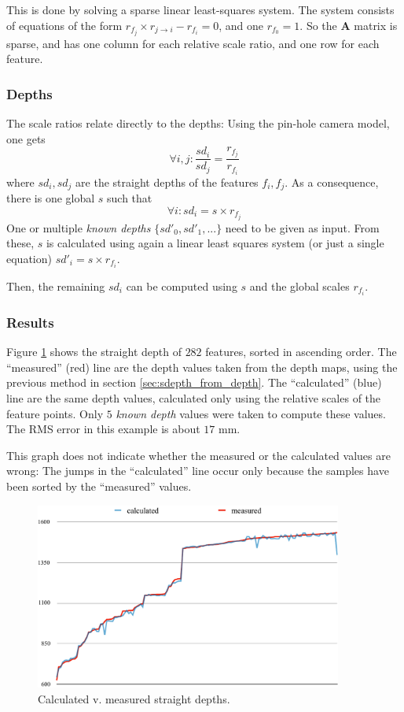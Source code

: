 \documentclass{scrreprt}
\newcommand{\matr}[1]{\mathbf{#1}}
\begin{document}
This is done by solving a sparse linear least-squares system. The system consists of equations of the form $r_{f_j} \times r_{j\rightarrow i} - r_{f_i} = 0$, and one $r_{f_0} = 1$. So the $\matr{A}$ matrix is sparse, and has one column for each relative scale ratio, and one row for each feature.


\subsubsection{Depths}
The scale ratios relate directly to the depths: Using the pin-hole camera model, one gets
\begin{equation*}
\forall i,j : \frac{sd_i}{sd_j} = \frac{r_{f_j}}{r_{f_i}}
\end{equation*}
where $sd_i, sd_j$ are the straight depths of the features $f_i, f_j$. As a consequence, there is one global $s$ such that
\begin{equation*}
\forall i : sd_{i} = s \times r_{f_j}
\end{equation*}
One or multiple \emph{known depths} $\{ sd'_0, sd'_1, ... \}$ need to be given as input. From these, $s$ is calculated using again a linear least squares system (or just a single equation) $sd'_{i} = s \times r_{f_i}$.

Then, the remaining $sd_i$ can be computed using $s$ and the global scales $r_{f_i}$.

\subsubsection{Results}
Figure \ref{fig:depthcomp} shows the straight depth of $282$ features, sorted in ascending order. The ``measured'' (red) line are the depth values taken from the depth maps, using the previous method in section \ref{sec:sdepth_from_depth}. The ``calculated'' (blue) line are the same depth values, calculated only using the relative scales of the feature points. Only $5$ \emph{known depth} values were taken to compute these values. The RMS error in this example is about $17 \text{ mm}$.

This graph does not indicate whether the measured or the calculated values are wrong: The jumps in the ``calculated'' line occur only because the samples have been sorted by the ``measured'' values.

\begin{figure}
\centering
\includegraphics[width=0.9\textwidth]{depthcomp.pdf}
\caption{Calculated v. measured straight depths.}
\label{fig:depthcomp}
\end{figure}
\end{document}
